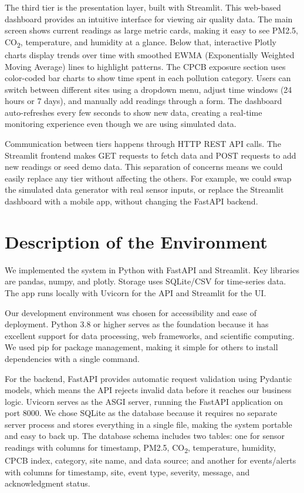 \documentclass[12pt]{report}
\begin{document}
The third tier is the presentation layer, built with Streamlit. This web-based dashboard provides an intuitive interface for viewing air quality data. The main screen shows current readings as large metric cards, making it easy to see PM2.5, CO\textsubscript{2}, temperature, and humidity at a glance. Below that, interactive Plotly charts display trends over time with smoothed EWMA (Exponentially Weighted Moving Average) lines to highlight patterns. The CPCB exposure section uses color-coded bar charts to show time spent in each pollution category. Users can switch between different sites using a dropdown menu, adjust time windows (24 hours or 7 days), and manually add readings through a form. The dashboard auto-refreshes every few seconds to show new data, creating a real-time monitoring experience even though we are using simulated data.

Communication between tiers happens through HTTP REST API calls. The Streamlit frontend makes GET requests to fetch data and POST requests to add new readings or seed demo data. This separation of concerns means we could easily replace any tier without affecting the others. For example, we could swap the simulated data generator with real sensor inputs, or replace the Streamlit dashboard with a mobile app, without changing the FastAPI backend.

\section{Description of the Environment}
We implemented the system in Python with FastAPI and Streamlit. Key libraries are pandas, numpy, and plotly. Storage uses SQLite/CSV for time-series data. The app runs locally with Uvicorn for the API and Streamlit for the UI.

Our development environment was chosen for accessibility and ease of deployment. Python 3.8 or higher serves as the foundation because it has excellent support for data processing, web frameworks, and scientific computing. We used pip for package management, making it simple for others to install dependencies with a single command.

For the backend, FastAPI provides automatic request validation using Pydantic models, which means the API rejects invalid data before it reaches our business logic. Uvicorn serves as the ASGI server, running the FastAPI application on port 8000. We chose SQLite as the database because it requires no separate server process and stores everything in a single file, making the system portable and easy to back up. The database schema includes two tables: one for sensor readings with columns for timestamp, PM2.5, CO\textsubscript{2}, temperature, humidity, CPCB index, category, site name, and data source; and another for events/alerts with columns for timestamp, site, event type, severity, message, and acknowledgment status.
\end{document}
